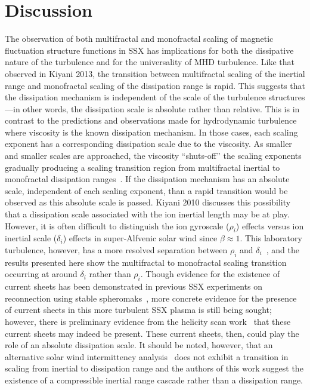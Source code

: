 \documentclass[preprint2]{aastex}
\begin{document}
\section{Discussion}

The observation of both multifractal and monofractal scaling of magnetic fluctuation structure functions in SSX has implications for both the dissipative nature of the turbulence and for the universality of MHD turbulence. Like that observed in Kiyani 2013, the transition between multifractal scaling of the inertial range and monofractal scaling of the dissipation range is rapid. This suggests that the dissipation mechanism is independent of the scale of the turbulence structures---in other words, the dissipation scale is absolute rather than relative. This is in contrast to the predictions and observations made for hydrodynamic turbulence where viscosity is the known dissipation mechanism. In those cases, each scaling exponent has a corresponding dissipation scale due to the viscosity. As smaller and smaller scales are approached, the viscosity ``shuts-off'' the scaling exponents gradually producing a scaling transition region from multifractal inertial to monofractal dissipation ranges~\citep{benzi1984,frisch1991}. If the dissipation mechanism has an absolute scale, independent of each scaling exponent, than a rapid transition would be observed as this absolute scale is passed. Kiyani 2010 discusses this possibility that a dissipation scale associated with the ion inertial length may be at play. However, it is often difficult to distinguish the ion gyroscale ($\rho_i$) effects versus ion inertial scale ($\delta_i$) effects in super-Alfvenic solar wind since $\beta \approx 1$. This laboratory turbulence, however, has a more resolved separation between $\rho_i$ and $\delta_i$~\citep{schaffner2014c}, and the results presented here show the multifractal to monofractal scaling transition occurring at around $\delta_i$ rather than $\rho_i$. Though evidence for the existence of current sheets has been demonstrated in previous SSX experiments on reconnection using stable spheromaks~\citep{brown2012}, more concrete evidence for the presence of current sheets in this more turbulent SSX plasma is still being sought; however, there is preliminary evidence from the helicity scan work~\citep{schaffner2014b} that these current sheets may indeed be present. These current sheets, then, could play the role of an absolute dissipation scale. It should be noted, however, that an alternative solar wind intermittency analysis~\citep{alexandrova2008} does not exhibit a transition in scaling from inertial to dissipation range and the authors of this work suggest the existence of a compressible inertial range cascade rather than a dissipation range.
\end{document}
